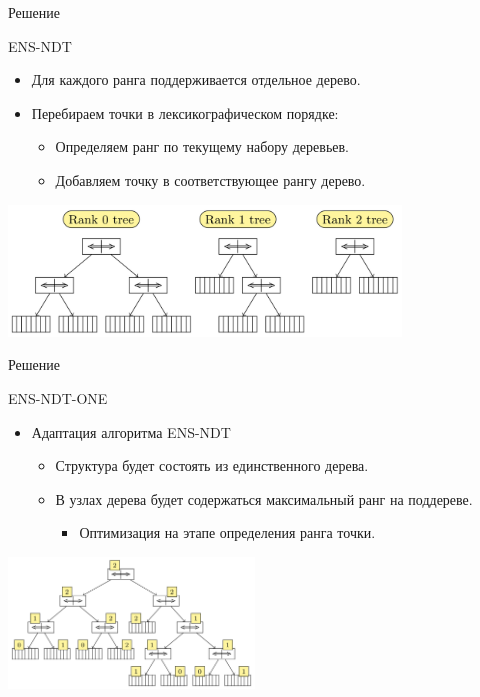 \documentclass[table]{beamer}
\begin{document}
\begin{frame}{Решение}
\begin{block}{ENS-NDT}
\begin{itemize}
\item Для каждого ранга поддерживается отдельное дерево.
\item Перебираем точки в лексикографическом порядке:
\begin{itemize}
\item Определяем ранг по текущему набору деревьев. 
\item Добавляем точку в соответствующее рангу дерево. 
\end{itemize}
\end{itemize}
\begin{center}
\includegraphics*[height=3.5cm]{pic/ndtree_original.png}
\end{center}
\end{block}
\end{frame}

\begin{frame}{Решение}
\begin{block}{ENS-NDT-ONE}
\begin{itemize}
\item Адаптация алгоритма ENS-NDT
\begin{itemize}
\item Структура будет состоять из единственного дерева.
\item В узлах дерева будет содержаться максимальный ранг на поддереве.
\begin{itemize}
  \item Оптимизация на этапе определения ранга точки.
\end{itemize}
\end{itemize}
\end{itemize}
\begin{center}
\includegraphics*[height=3.5cm]{pic/ndtree_new.png}
\end{center}
\end{block}
\end{frame}
\end{document}
